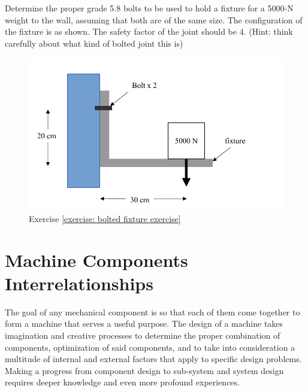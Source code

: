\documentclass[
10pt,
a4paper,
openany,
svgnames,
]{book}
\newcommand{\exercise}{%
\item \label{lab:\arabic{chapter}.\arabic{exercisesi}}  %
}
\begin{document}
\begin{exercises}
  \exercise \label{exercise: bolted fixture exercise} Determine the proper grade 5.8 bolts to be used to hold a fixture for a 5000-N weight to the wall, assuming that both are of the same size. The configuration of the fixture is as shown. The safety factor of the joint should be 4. (Hint: think carefully about what kind of bolted joint this is)

  \begin{figure}[H]
    \centering
    \includegraphics[scale=0.8]{pictures/Bolt/bolted-fixture-exercise}
    \caption{Exercise \ref{exercise: bolted fixture exercise}}
  \end{figure}

\end{exercises}


\chapter{Machine Components Interrelationships}

The goal of any mechanical component is so that each of them come together to form a machine that serves a useful purpose. The design of a machine takes imagination and creative processes to determine the proper combination of components, optimization of said components, and to take into consideration a multitude of internal and external factors that apply to specific design problems. Making a progress from component design to sub-system and system design requires deeper knowledge and even more profound experiences.
\end{document}
